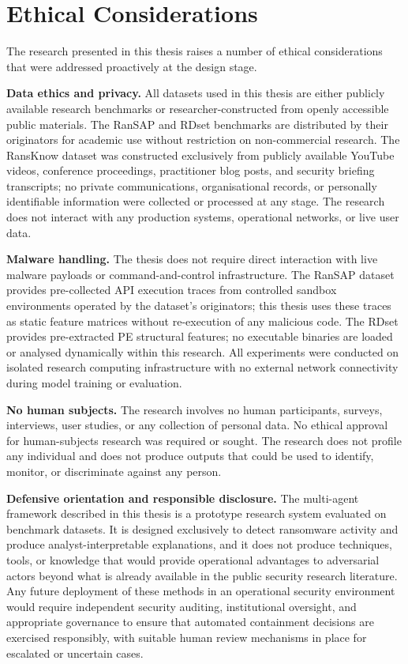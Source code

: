 \section{Ethical Considerations}
\label{sec:ethics}

The research presented in this thesis raises a number of ethical considerations that were
addressed proactively at the design stage.

\textbf{Data ethics and privacy.}
All datasets used in this thesis are either publicly available research benchmarks or
researcher-constructed from openly accessible public materials.
The RanSAP and RDset benchmarks are distributed by their originators for academic use without
restriction on non-commercial research.
The RansKnow dataset was constructed exclusively from publicly available YouTube videos,
conference proceedings, practitioner blog posts, and security briefing transcripts; no private
communications, organisational records, or personally identifiable information were collected
or processed at any stage.
The research does not interact with any production systems, operational networks, or
live user data.

\textbf{Malware handling.}
The thesis does not require direct interaction with live malware payloads or command-and-control
infrastructure.
The RanSAP dataset provides pre-collected API execution traces from controlled sandbox
environments operated by the dataset's originators; this thesis uses these traces as static
feature matrices without re-execution of any malicious code.
The RDset provides pre-extracted PE structural features; no executable binaries are loaded or
analysed dynamically within this research.
All experiments were conducted on isolated research computing infrastructure with no external
network connectivity during model training or evaluation.

\textbf{No human subjects.}
The research involves no human participants, surveys, interviews, user studies, or any
collection of personal data.
No ethical approval for human-subjects research was required or sought.
The research does not profile any individual and does not produce outputs that could be used
to identify, monitor, or discriminate against any person.

\textbf{Defensive orientation and responsible disclosure.}
The multi-agent framework described in this thesis is a prototype research system evaluated
on benchmark datasets.
It is designed exclusively to detect ransomware activity and produce analyst-interpretable
explanations, and it does not produce techniques, tools, or knowledge that would provide
operational advantages to adversarial actors beyond what is already available in the public
security research literature.
Any future deployment of these methods in an operational security environment would require
independent security auditing, institutional oversight, and appropriate governance to ensure
that automated containment decisions are exercised responsibly, with suitable human review
mechanisms in place for escalated or uncertain cases.

